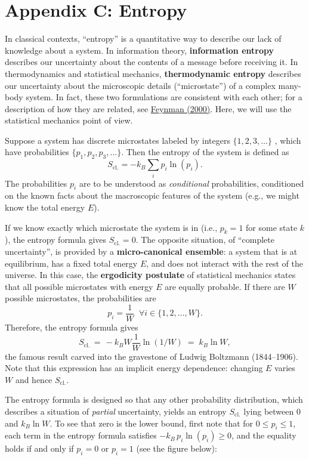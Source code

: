 \documentclass[pra,12pt]{revtex4}
\begin{document}
\section*{Appendix C: Entropy}

In classical contexts, ``entropy'' is a quantitative way to describe
our lack of knowledge about a system.  In information theory,
\textbf{information entropy} describes our uncertainty about the
contents of a message before receiving it.  In thermodynamics and
statistical mechanics, \textbf{thermodynamic entropy} describes our
uncertainty about the microscopic details (``microstate'') of a
complex many-body system.  In fact, these two formulations are
consistent with each other; for a description of how they are related,
see \hyperref[cite:feynman]{Feynman (2000)}.  Here, we will use the
statistical mechanics point of view.

Suppose a system has discrete microstates labeled by integers
$\{1,2,3,\dots\}$ , which have probabilities $\{p_1, p_2, p_3,
\dots\}$.  Then the entropy of the system is defined as
$$S_{\mathrm{cl.}} = - k_B \sum_{i} p_i \ln(p_i).$$
The probabilities $p_i$ are to be understood as \textit{conditional}
probabilities, conditioned on the known facts about the macroscopic
features of the system (e.g., we might know the total energy $E$).

If we know exactly which microstate the system is in (i.e., $p_k = 1$
for some state $k$), the entropy formula gives $S _{\mathrm{cl.}} =
0$.  The opposite situation, of ``complete uncertainty'', is provided
by a \textbf{micro-canonical ensemble}: a system that is at
equilibrium, has a fixed total energy $E$, and does not interact with
the rest of the universe.  In this case, the \textbf{ergodicity
  postulate} of statistical mechanics states that all possible
microstates with energy $E$ are equally probable.  If there are $W$
possible microstates, the probabilities are
$$p_i = \frac{1}{W} \;\;\forall i \in \{1,2,\dots,W\}.$$
Therefore, the entropy formula gives
$$S_{\mathrm{cl.}} \,=\, -k_B W \frac{1}{W} \ln(1/W) \;=\; k_B \ln W,$$
the famous result carved into the gravestone of Ludwig Boltzmann
(1844--1906).  Note that this expression has an implicit energy
dependence: changing $E$ varies $W$ and hence $S_{\mathrm{cl.}}$.

The entropy formula is designed so that any other probability
distribution, which describes a situation of \textit{partial}
uncertainty, yields an entropy $S_{\mathrm{cl.}}$ lying between $0$
and $k_B \ln W$.  To see that zero is the lower bound, first note that
for $0 \le p_i \le 1$, each term in the entropy formula satisfies
$-k_B\, p_i\ln(p_i) \ge 0$, and the equality holds if and only if $p_i
= 0$ or $p_i = 1$ (see the figure below):
\end{document}
